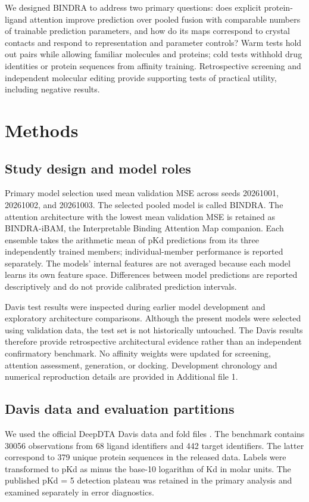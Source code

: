 \documentclass[12pt,a4paper]{article}
\begin{document}
We designed BINDRA to address two primary questions: does explicit protein-ligand attention improve prediction over pooled fusion with comparable numbers of trainable prediction parameters, and how do its maps correspond to crystal contacts and respond to representation and parameter controls? Warm tests hold out pairs while allowing familiar molecules and proteins; cold tests withhold drug identities or protein sequences from affinity training. Retrospective screening and independent molecular editing provide supporting tests of practical utility, including negative results.

\section*{Methods}
\subsection*{Study design and model roles}
Primary model selection used mean validation MSE across seeds 20261001, 20261002, and 20261003. The selected pooled model is called BINDRA. The attention architecture with the lowest mean validation MSE is retained as BINDRA-iBAM, the Interpretable Binding Attention Map companion. Each ensemble takes the arithmetic mean of pKd predictions from its three independently trained members; individual-member performance is reported separately. The models' internal features are not averaged because each model learns its own feature space. Differences between model predictions are reported descriptively and do not provide calibrated prediction intervals.

Davis test results were inspected during earlier model development and exploratory architecture comparisons. Although the present models were selected using validation data, the test set is not historically untouched. The Davis results therefore provide retrospective architectural evidence rather than an independent confirmatory benchmark. No affinity weights were updated for screening, attention assessment, generation, or docking. Development chronology and numerical reproduction details are provided in Additional file 1.

\subsection*{Davis data and evaluation partitions}
We used the official DeepDTA Davis data and fold files \citep{deepdta2018}. The benchmark contains 30056 observations from 68 ligand identifiers and 442 target identifiers. The latter correspond to 379 unique protein sequences in the released data. Labels were transformed to pKd as minus the base-10 logarithm of Kd in molar units. The published pKd = 5 detection plateau was retained in the primary analysis and examined separately in error diagnostics.
\end{document}
